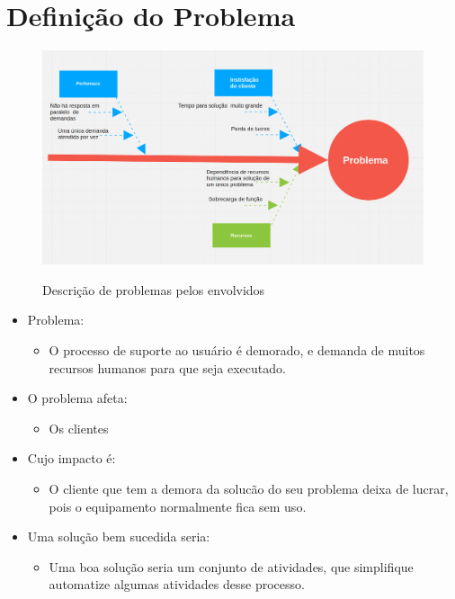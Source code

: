 \section{Definição do Problema}

\begin{figure}[!h]
\caption{Descrição de problemas pelos envolvidos}
\centering %
\includegraphics[width=15cm]{fishbone.png}
\label{figura:Fishbone de Problemas }
\end{figure}


\begin{itemize}[noitemsep]
  \item Problema:
    \begin{itemize}
      \item O processo de suporte ao usuário é demorado, e demanda de muitos recursos
           humanos para que seja executado.
    \end{itemize}
  \item O problema afeta:
    \begin{itemize}
      \item Os clientes
    \end{itemize}
  \item Cujo impacto é:
    \begin{itemize}
      \item	O cliente que tem a demora da solucão do seu problema
           deixa de lucrar, pois o equipamento normalmente fica sem uso.
    \end{itemize}
  \item Uma solução bem sucedida seria:
    \begin{itemize}
      \item Uma boa solução seria um conjunto de atividades, que simplifique
       automatize algumas atividades desse processo.
     \end{itemize}
\end{itemize}

